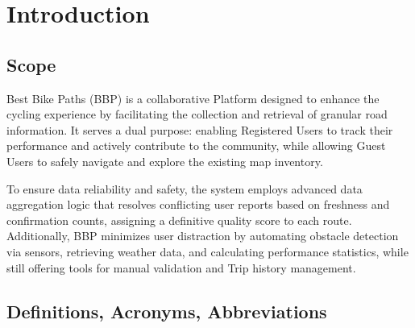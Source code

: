 \chapter{Introduction}
\section{Scope}

Best Bike Paths (BBP) is a collaborative Platform designed to enhance the cycling experience by facilitating the collection and retrieval of granular road information. It serves a dual purpose: enabling Registered Users to track their performance and actively contribute to the community, while allowing Guest Users to safely navigate and explore the existing map inventory.

To ensure data reliability and safety, the system employs advanced data aggregation logic that resolves conflicting user reports based on freshness and confirmation counts, assigning a definitive quality score to each route. Additionally, BBP minimizes user distraction by automating obstacle detection via sensors, retrieving weather data, and calculating performance statistics, while still offering tools for manual validation and Trip history management.

\section{Definitions, Acronyms, Abbreviations}
